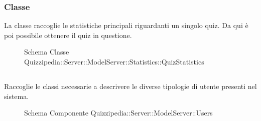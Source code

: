 \subsubsection{Classe }
La classe raccoglie le statistiche principali riguardanti un singolo quiz. Da qui è poi possibile ottenere il quiz in questione.
\begin{figure}[H]
\centering
\noindent{}
\caption[Schema Classe QuizStatistics]{Schema Classe Quizzipedia::Server::ModelServer::Statistics::QuizStatistics}
\end{figure}
\subsection{}
Raccoglie le classi necessarie a descrivere le diverse tipologie di utente presenti nel sistema.
\begin{figure}[H]
\centering
\noindent{}
\caption[Schema Componente Quizzipedia::Server::ModelServer::Users]{Schema Componente Quizzipedia::Server::ModelServer::Users}
\end{figure}
